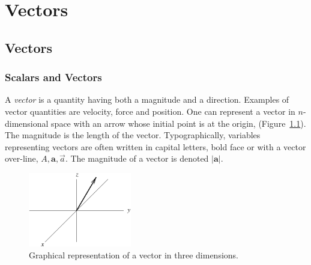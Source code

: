 \flushbottom





\chapter{Vectors}





\section{Vectors}


\subsection{Scalars and Vectors}

A \textit{vector} is a quantity having both a magnitude and a direction.
Examples of vector quantities are velocity, force and position.  
One can represent a vector in $n$-dimensional space with an arrow whose
initial point is at the origin, (Figure~\ref{vector}).
The magnitude is the length of the vector.  Typographically, variables 
representing vectors are often written in capital letters, bold face or with a 
vector over-line, $A, \mathbf{a}, \vec{a}$.  The magnitude of a vector is 
denoted $| \mathbf{a} |$.

\begin{figure}[htb!]
\begin{center}
  \includegraphics[width=0.4\textwidth]{algebra/vectors/vector}
\end{center}
\caption{Graphical representation of a vector in three dimensions.}
\label{vector}
\end{figure}

